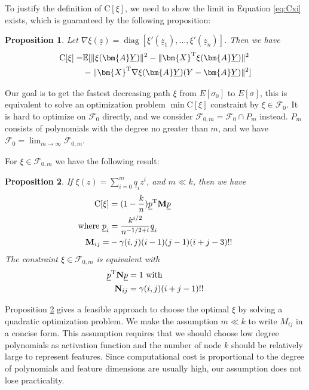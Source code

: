 \documentclass[conference]{IEEEtran}
\newtheorem{proposition}{Proposition}
\DeclarePairedDelimiter\norm{\lVert}{\rVert}
\def\E{\mathbb{E}}
\def\T{\mathrm{T}}
\DeclareMathOperator*{\diag}{diag}
\newcommand{\ide}[2]{ \gamma(#1,#2) }
\begin{document}
To justify the definition of $\mathrm{C}[\xi]$, we need to show the limit in Equation \eqref{eq:Cxi} exists, which is guaranteed by the following proposition:

\begin{proposition}\label{prop:Esigma} 
Let $\nabla \xi(\underline{z})  = \diag[\xi'(\underline{z}_1), \dots, \xi'(\underline{z}_n)]$. Then we have
\begin{align}\notag
\mathrm{C}[\xi]= & \E[\norm{\xi(\bm{A}\underline{Y})}^2 -
\norm{\bm{X}^\T\xi(\bm{A}\underline{Y})}^2 \\
&- \norm{\bm{X}^\T \nabla\xi(\bm{A}\underline{Y})(Y-\bm{A}\underline{Y})}^2]
\end{align}
\end{proposition}

Our goal is to get the fastest decreasing path $\xi$ from $E[\sigma_0]$ to $E[\sigma]$, this is equivalent to solve an optimization problem $\min \mathrm{C}[\xi]$ constraint by $\xi \in \mathcal{F}_0$. It is hard to optimize on $\mathcal{F}_0$ directly, and we consider $\mathcal{F}_{0,m} = \mathcal{F}_0 \cap P_m$ instead. $P_m$ consists of polynomials with the degree no greater than $m$, and we have $\mathcal{F}_0 = \lim_{m\to \infty} \mathcal{F}_{0,m}$.

For $\xi \in \mathcal{F}_{0,m}$ we have the following result:
\begin{proposition}\label{prop:quadratic}
If
$\xi(z) = \sum_{i=0}^m \underline{q}_i z^i$,
and $m \ll k$, then we have 
\begin{align}
\mathrm{C}[\xi] &= (1-\frac{k}{n}) \underline{p}^\T \mathbf{M} \underline{p} \notag\\
\textrm{where }\underline{p}_i &= \frac{k^{i/2}}{n^{- 1/2 + i}}\underline{q}_i\label{eq:pqt} \\
\mathbf{M}_{ij} =& -\ide{i}{j}(i-1)(j-1)(i+j-3)!! \notag
\end{align}
The constraint $\xi \in \mathcal{F}_{0,m}$ is equivalent with
\begin{align}
\underline{p}^\T \mathbf{N} \underline{p} & = 1 \textrm{ with }\notag\\
\mathbf{N}_{ij}  & = \ide{i}{j}(i+j-1)!!
\end{align}
\end{proposition}

Proposition \ref{prop:quadratic} gives a feasible approach to choose the optimal $\xi$ by solving a quadratic optimization problem. We make the assumption $
m \ll k$ to write $M_{ij}$ in a concise form. This assumption requires that we should choose low degree polynomials as activation function and the number of node $k$ should be relatively large to represent features. Since computational cost
is proportional to the degree of polynomials and feature dimensions are usually high, our assumption does not lose practicality. 
\end{document}
